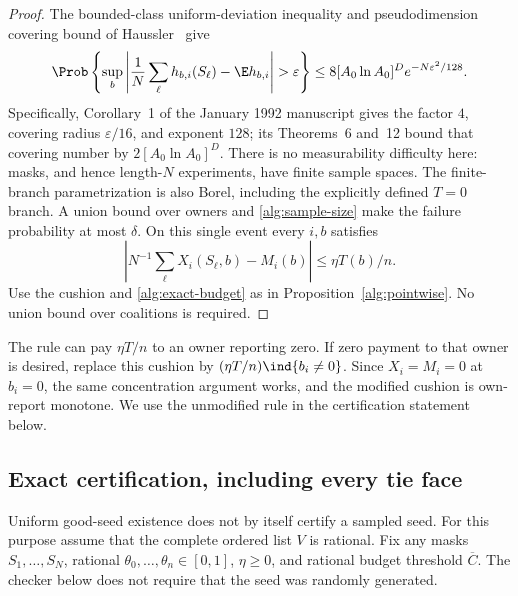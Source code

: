 \begin{proof}
The bounded-class uniform-deviation inequality and pseudodimension covering
bound of Haussler~\cite{Haussler1992} give
\begin{equation}\label{alg:uniform-tail}
 \Prob\left\{\sup_b\left|\frac1N\sum_\ell h_{b,i}(S_\ell)
                  -\E h_{b,i}\right|>\varepsilon\right\}
 \le8[A_0\ln A_0]^D e^{-N\varepsilon^2/128}.
\end{equation}
Specifically, Corollary~1 of the January 1992 manuscript gives the factor
$4$, covering radius $\varepsilon/16$, and exponent $128$; its Theorems~6
and~12 bound that covering number by $2[A_0\ln A_0]^D$.
There is no measurability difficulty here: masks, and hence length-$N$
experiments, have finite sample spaces.  The finite-branch parametrization
is also Borel, including the explicitly defined $T=0$ branch.
A union bound over owners and \eqref{alg:sample-size} make the failure
probability at most $\delta$.  On this single event every $i,b$ satisfies
\[
 \left|N^{-1}\sum_\ell X_i(S_\ell,b)-M_i(b)\right|
       \le\eta T(b)/n.
\]
Use the cushion and \eqref{alg:exact-budget} as in
Proposition~\ref{alg:pointwise}.  No union bound over coalitions is required.
\end{proof}
The rule can pay $\eta T/n$ to an owner reporting zero.  If zero payment to
that owner is desired, replace this cushion by
$(\eta T/n)\ind\{b_i\ne0\}$.  Since $X_i=M_i=0$ at $b_i=0$, the same
concentration argument works, and the modified cushion is own-report monotone.
We use the unmodified rule in the certification statement below.

\subsection{Exact certification, including every tie face}
Uniform good-seed existence does not by itself certify a sampled seed.
For this purpose assume that the complete ordered list $V$ is rational.
Fix any masks $S_1,\ldots,S_N$, rational $\theta_0,\ldots,\theta_n\in[0,1]$,
$\eta\ge0$, and rational budget threshold $\overline C$.
The checker below does not require that the seed was randomly generated.

